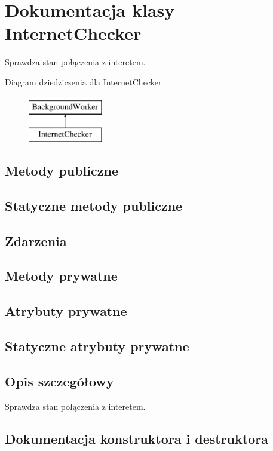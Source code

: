 \hypertarget{a00026}{}\section{Dokumentacja klasy Internet\+Checker}
\label{a00026}


Sprawdza stan połączenia z interetem.  


Diagram dziedziczenia dla Internet\+Checker\begin{figure}[H]
\begin{center}
\leavevmode
\includegraphics[height=2.000000cm]{d6/d5b/a00026}
\end{center}
\end{figure}
\subsection*{Metody publiczne}
\subsection*{Statyczne metody publiczne}
\subsection*{Zdarzenia}
\subsection*{Metody prywatne}
\subsection*{Atrybuty prywatne}
\subsection*{Statyczne atrybuty prywatne}


\subsection{Opis szczegółowy}
Sprawdza stan połączenia z interetem. 



\subsection{Dokumentacja konstruktora i destruktora}
\hypertarget{a00026_a3ee441cb6f97516399779146374e6912}{}
